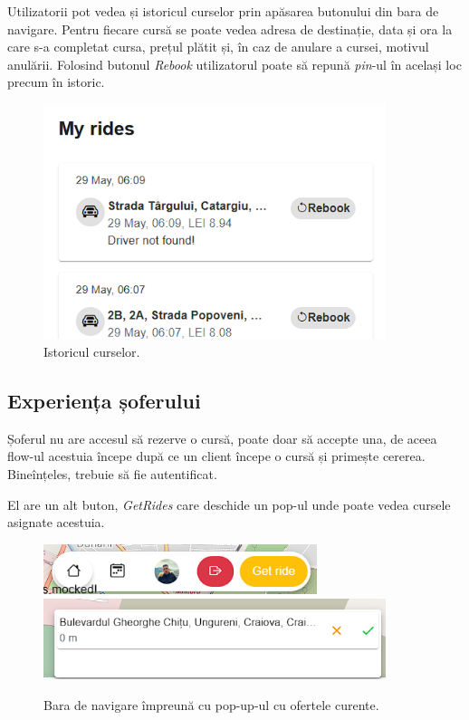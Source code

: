 Utilizatorii pot vedea și istoricul curselor prin apăsarea butonului din bara de navigare.
Pentru fiecare cursă se poate vedea adresa de destinație, data și ora la care s-a completat cursa, prețul plătit
și, în caz de anulare a cursei, motivul anulării. Folosind butonul \textit{Rebook} utilizatorul poate
să repună \textit{pin}-ul în același loc precum în istoric.

\begin{figure}[H]
    \centering
    \includegraphics[width=10cm]{Assets/history.png}
    \caption{Istoricul curselor.}
    \label{fig:historyRides}
\end{figure}

\subsection{Experiența șoferului}

Șoferul nu are accesul să rezerve o cursă, poate doar să accepte una, de aceea flow-ul acestuia începe după 
ce un client începe o cursă și primește cererea. Bineînțeles, trebuie să fie autentificat.

El are un alt buton, \textit{GetRides} care deschide un pop-ul unde poate vedea cursele asignate acestuia.

\begin{figure}[H]
    \centering
    \includegraphics[width=8cm]{Assets/driverNavBar.png}
    \includegraphics[width=10cm]{Assets/acceptRide.png}
    \caption{Bara de navigare împreună cu pop-up-ul cu ofertele curente.}
    \label{fig:driverNavBar}
\end{figure}

